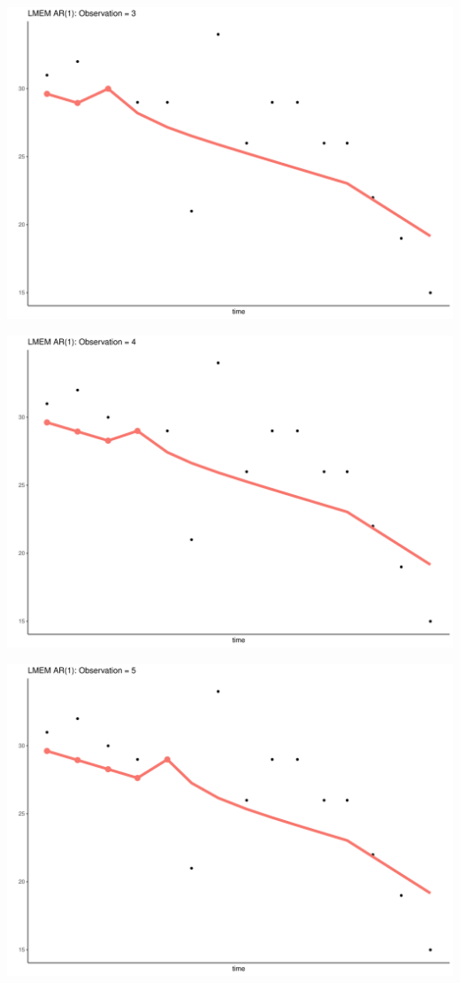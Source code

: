 \documentclass[
  ignorenonframetext,
]{beamer}
\begin{document}
\begin{frame}{}
\protect\hypertarget{section-17}{}
\includegraphics{Prez4_files/figure-beamer/unnamed-chunk-14-3.pdf}
\end{frame}

\begin{frame}{}
\protect\hypertarget{section-18}{}
\includegraphics{Prez4_files/figure-beamer/unnamed-chunk-14-4.pdf}
\end{frame}

\begin{frame}{}
\protect\hypertarget{section-19}{}
\includegraphics{Prez4_files/figure-beamer/unnamed-chunk-14-5.pdf}
\end{frame}
\end{document}
